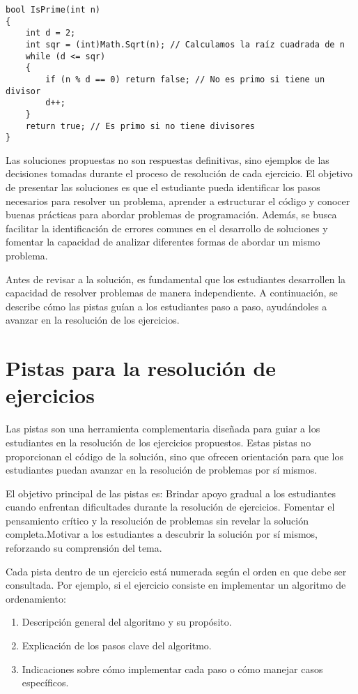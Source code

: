 \documentclass{article}
\begin{document}
\begin{lstlisting}
bool IsPrime(int n)
{
    int d = 2;
    int sqr = (int)Math.Sqrt(n); // Calculamos la raíz cuadrada de n
    while (d <= sqr)
    {
        if (n % d == 0) return false; // No es primo si tiene un divisor
        d++;
    }
    return true; // Es primo si no tiene divisores
}
\end{lstlisting}

Las soluciones propuestas no son respuestas definitivas, sino ejemplos de las decisiones tomadas durante el proceso de resolución de cada ejercicio. El objetivo de presentar las soluciones es que el estudiante pueda identificar los pasos necesarios para resolver un problema, aprender a estructurar el código y conocer buenas prácticas para abordar problemas de programación. Además, se busca facilitar la identificación de errores comunes en el desarrollo de soluciones y fomentar la capacidad de analizar diferentes formas de abordar un mismo problema.

Antes de revisar a la solución, es fundamental que los estudiantes desarrollen la capacidad de resolver problemas de manera independiente. A continuación, se describe cómo las pistas guían a los estudiantes paso a paso, ayudándoles a avanzar en la resolución de los ejercicios.

\section{Pistas para la resolución de ejercicios}

Las pistas son una herramienta complementaria diseñada para guiar a los estudiantes en la resolución de los ejercicios propuestos. Estas pistas no proporcionan el código de la solución, sino que ofrecen orientación para que los estudiantes puedan avanzar en la resolución de problemas por sí mismos. 

El objetivo principal de las pistas es: Brindar apoyo gradual a los estudiantes cuando enfrentan dificultades durante la resolución de ejercicios. Fomentar el pensamiento crítico y la resolución de problemas sin revelar la solución completa.Motivar a los estudiantes a descubrir la solución por sí mismos, reforzando su comprensión del tema.

Cada pista dentro de un ejercicio está numerada según el orden en que debe ser consultada. Por ejemplo, si el ejercicio consiste en implementar un algoritmo de ordenamiento:
\begin{enumerate}
    \item  Descripción general del algoritmo y su propósito.
    \item Explicación de los pasos clave del algoritmo.
    \item Indicaciones sobre cómo implementar cada paso o cómo manejar casos específicos.
\end{enumerate}
\end{document}
